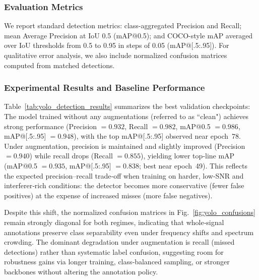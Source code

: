 \subsubsection{Evaluation Metrics}
We report standard detection metrics: class-aggregated Precision and Recall; mean Average Precision at IoU 0.5 (mAP@0.5); and COCO-style mAP averaged over IoU thresholds from 0.5 to 0.95 in steps of 0.05 (mAP@[.5:.95]). For qualitative error analysis, we also include normalized confusion matrices computed from matched detections.

\subsubsection{Experimental Results and Baseline Performance}
\begin{table}[hht]
\centering
\caption{YOLO detection results.}
\label{tab:yolo_detection_results}
\end{table}

Table~\ref{tab:yolo_detection_results} summarizes the best validation checkpoints: The model trained without any augmentations (referred to as ``clean") achieves strong performance (Precision $=0.932$, Recall $=0.982$, mAP@0.5 $=0.986$, mAP@[.5:.95] $=0.948$), with the top mAP@[.5:.95] observed near epoch~78. Under augmentation, precision is maintained and slightly improved (Precision $=0.940$) while recall drops (Recall $=0.855$), yielding lower top‑line mAP (mAP@0.5 $=0.935$, mAP@[.5:.95] $=0.838$; best near epoch~49). This reflects the expected precision–recall trade‑off when training on harder, low‑SNR and interferer‑rich conditions: the detector becomes more conservative (fewer false positives) at the expense of increased misses (more false negatives). 

Despite this shift, the normalized confusion matrices in Fig.~\ref{fig:yolo_confusions} remain strongly diagonal for both regimes, indicating that whole‑signal annotations preserve class separability even under frequency shifts and spectrum crowding. The dominant degradation under augmentation is recall (missed detections) rather than systematic label confusion, suggesting room for robustness gains via longer training, class‑balanced sampling, or stronger backbones without altering the annotation policy.

